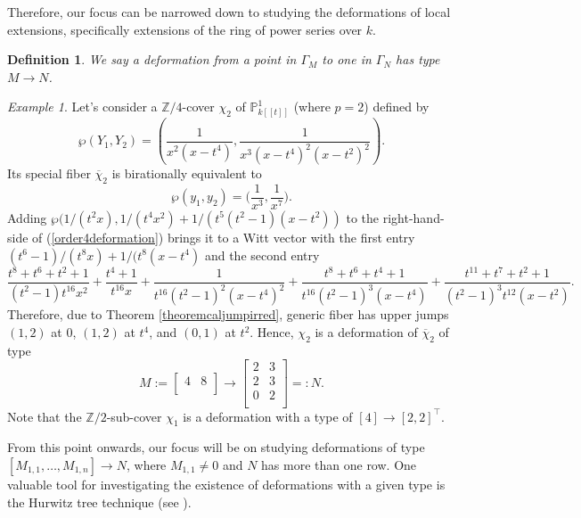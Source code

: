 \documentclass{compositio}
\newtheorem{definition}[theorem]{Definition}
\theoremstyle{remark}
\newtheorem{example}[theorem]{Example}
\theoremstyle{remark}
\begin{document}
Therefore, our focus can be narrowed down to studying the deformations of local extensions, specifically extensions of the ring of power series over $k$.




\begin{definition}
    We say a deformation from a point in $\Gamma_{M}$ to one in $\Gamma_{N}$  has \emph{type} $M \xrightarrow{} N$.
\end{definition}



\begin{example}
\label{examplenonossdeformation}
Let's consider a $\mathbb{Z}/4$-cover $\chi_2$ of $\mathbb{P}^1_{k[[t]]}$ (where $p=2$) defined by
\begin{equation}
\label{order4deformation}
\wp(Y_1,Y_2)=\left(\frac{1}{x^2(x-t^4)}, \frac{1}{x^3(x-t^4)^2(x-t^2)^2}\right).
\end{equation}
Its special fiber $\overline{\chi}_2$ is birationally equivalent to
\[ \wp(y_1,y_2)=\bigg( \frac{1}{x^3}, \frac{1}{x^7} \bigg). \]
Adding $\wp(1/(t^2x), 1/(t^4x^2)+ 1/(t^5(t^2-1)(x-t^2))$ to the right-hand-side of (\ref{order4deformation}) brings it to a Witt vector with the first entry $(t^6-1)/(t^8x)+1/(t^8(x-t^4)$ and the second entry
\begin{equation*}
    \frac{t^8+t^6+t^2+1}{(t^2-1)t^{16}x^2}+ \frac{t^4+1}{t^{16}x}+\frac{1}{t^{16}(t^2-1)^2(x-t^4)^2} + \frac{t^8+t^6+t^4+1}{t^{16}(t^2-1)^3(x-t^4)}+\frac{t^{11}+t^7+t^2+1}{(t^2-1)^3t^{12}(x-t^2)}.
\end{equation*}
Therefore, due to Theorem \ref{theoremcaljumpirred}, generic fiber has upper jumps $(1,2)$ at $0$, $(1,2)$ at $t^4$, and $(0,1)$ at $t^2$. Hence, $\chi_2$ is a deformation of $\overline{\chi}_2$ of type
\[M:= \begin{bmatrix}
4 & 8 \\
\end{bmatrix} \xrightarrow{}  \begin{bmatrix}
   2 & 3 \\
   2 & 3 \\
   0 & 2\\
   \end{bmatrix}=:N. \] 
Note that the $\mathbb{Z}/2$-sub-cover $\chi_1$ is a deformation with a type of $[4] \to [2,2]^{\top}$. 
\end{example}





From this point onwards, our focus will be on studying deformations of type $[M_{1,1}, \ldots, M_{1, n}] \to N$, where $M_{1,1} \neq 0$ and $N$ has more than one row. One valuable tool for investigating the existence of deformations with a given type is the Hurwitz tree technique (see \cite[\S 4]{2020arXiv201013614D}).
\end{document}
